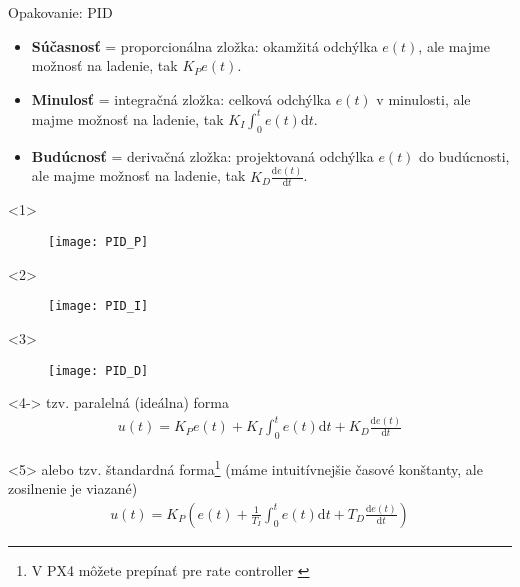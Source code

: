 \begin{frame}[t]{Opakovanie: PID}
  \begin{itemize}
    \item<1-> \textbf{Súčasnosť} = proporcionálna zložka: okamžitá odchýlka $e(t)$, ale majme možnosť na ladenie, tak $K_Pe(t)$.
    \item<2-> \textbf{Minulosť} = integračná zložka: celková odchýlka $e(t)$ v minulosti, ale majme možnosť na ladenie, tak $K_I\int_0^te(t)\mathrm{d}t$.
    \item<3-> \textbf{Budúcnosť} = derivačná zložka: projektovaná odchýlka $e(t)$ do budúcnosti, ale majme možnosť na ladenie, tak $K_D\frac{\mathrm{d}e(t)}{\mathrm{d}t}$.
  \end{itemize}

\begin{onlyenv}<1>
\begin{figure}
\centering
  \texttt{[image: PID\_P]}\\
\end{figure}
\end{onlyenv}

\begin{onlyenv}<2>
\begin{figure}
\centering
  \texttt{[image: PID\_I]}\\
\end{figure}
\end{onlyenv}

\begin{onlyenv}<3>
\begin{figure}
\centering
  \texttt{[image: PID\_D]}\\
\end{figure}
\end{onlyenv}


\begin{onlyenv}<4->
tzv. paralelná (ideálna) forma
\begin{align}
u(t)= K_Pe(t)+K_I\int_0^te(t)\mathrm{d}t+K_D\frac{\mathrm{d}e(t)}{\mathrm{d}t}
\end{align}
\end{onlyenv}

\begin{onlyenv}<5>
alebo tzv. štandardná forma\footnote{V PX4 môžete prepínať pre rate controller \cite{PX4:PIDTuning}} (máme intuitívnejšie časové konštanty, ale zosilnenie je viazané)
\begin{align}
u(t)= K_P\left(e(t)+\frac{1}{T_I}\int_0^te(t)\mathrm{d}t+T_D\frac{\mathrm{d}e(t)}{\mathrm{d}t}\right)
\end{align}
\end{onlyenv}
\end{frame}




